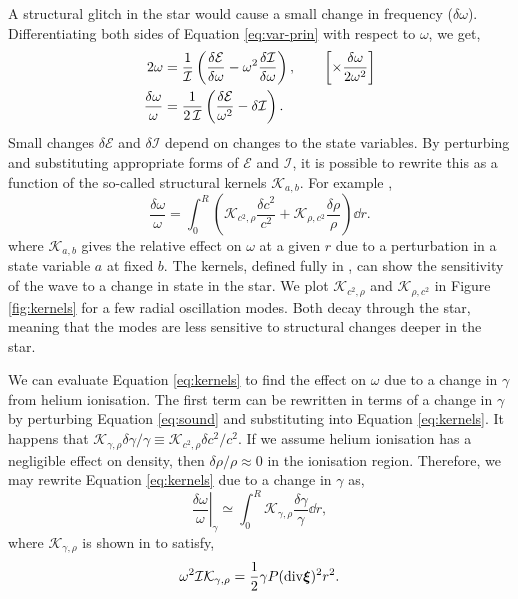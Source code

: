 A structural glitch in the star would cause a small change in frequency (\(\delta\omega\)). Differentiating both sides of Equation \ref{eq:var-prin} with respect to \(\omega\), we get,
%
\begin{align}
    2\omega &= \frac{1}{\mathcal{I}} \left( \frac{\delta\mathcal{E}}{\delta\omega} - \omega^2 \frac{\delta\mathcal{I}}{\delta\omega}\right), \qquad \left[\times \frac{\delta\omega}{2\omega^2}\right] \notag \\
    \frac{\delta\omega}{\omega} &= \frac{1}{2\,\mathcal{I}} \left(\frac{\delta\mathcal{E}}{\omega^2} - \delta\mathcal{I}\right).
\end{align}
%
Small changes \(\delta\mathcal{E}\) and \(\delta\mathcal{I}\) depend on changes to the state variables. By perturbing and substituting appropriate forms of \(\mathcal{E}\) and \(\mathcal{I}\), it is possible to rewrite this as a function of the so-called structural kernels \(\mathcal{K}_{a,b}\). For example \citep{Christensen-Dalsgaard2014},
%
\begin{equation}
    \frac{\delta\omega}{\omega} = \int_0^R \left(\mathcal{K}_{c^2,\rho} \frac{\delta c^2}{c^2} + \mathcal{K}_{\rho,c^2} \frac{\delta \rho}{\rho} \right) \dd r.\label{eq:kernels}
\end{equation}
%
where \(\mathcal{K}_{a, b}\) gives the relative effect on \(\omega\) at a given \(r\) due to a perturbation in a state variable \(a\) at fixed \(b\). The kernels, defined fully in \citet{Gough.Thompson1991}, can show the sensitivity of the wave to a change in state in the star. We plot \(\mathcal{K}_{c^2,\rho}\) and \(\mathcal{K}_{\rho,c^2}\) in Figure \ref{fig:kernels} for a few radial oscillation modes. Both decay through the star, meaning that the modes are less sensitive to structural changes deeper in the star.

We can evaluate Equation \ref{eq:kernels} to find the effect on \(\omega\) due to a change in \(\gamma\) from helium ionisation. The first term can be rewritten in terms of a change in \(\gamma\) by perturbing Equation \ref{eq:sound} and substituting into Equation \ref{eq:kernels}. It happens that \(\mathcal{K}_{\gamma,\rho} \delta \gamma / \gamma \equiv \mathcal{K}_{c^2,\rho} \delta c^2 / c^2\). If we assume helium ionisation has a negligible effect on density, then \(\delta\rho/\rho \approx 0\) in the ionisation region. Therefore, we may rewrite Equation \ref{eq:kernels} due to a change in \(\gamma\) as,
%
\begin{equation}
    \left.\frac{\delta\omega}{\omega}\right|_\gamma \simeq \int_0^R \mathcal{K}_{\gamma,\rho} \frac{\delta\gamma}{\gamma} \dd r,\label{eq:delta-omega}
\end{equation}
%
where \(\mathcal{K}_{\gamma,\rho}\) is shown in \citet{Gough1993} to satisfy,
%
\begin{equation}
    \omega^2 \mathcal{I}\mathcal{K}_{\gamma,\rho} = \frac12 \gamma P (\mathrm{div} \bm{\xi})^2 r^2.\label{eq:gamma-kernel}
\end{equation}
%


